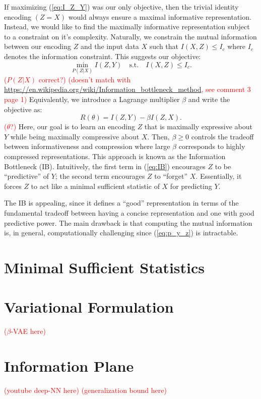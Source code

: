 \documentclass[11pt]{article}
\newcommand\myworries[1]{\textcolor{red}{(#1)}}
\begin{document}
If maximizing (\ref{eq:I_Z_Y}) was our only objective, then the trivial identity encoding $(Z = X)$ would always ensure a maximal informative representation. Instead, we would like to find the maximally informative representation subject to a constraint on it's complexity. Naturally, we constrain the mutual information between our encoding $Z$ and the input data $X$ such that $I(X,Z) \leq I_c$ where $I_c$ denotes the information constraint. This suggests our objective:
\begin{equation}
\underset{P(Z\vert X)}{\min} I(Z,Y) \quad\text{s.t.}\quad I(X,Z) \leq I_c.
\end{equation}
\myworries{$P(Z\vert X)$ correct?}
\myworries{doesn't match with \url{https://en.wikipedia.org/wiki/Information_bottleneck_method}, see comment 3 page 1}
Equivalently, we introduce a Lagrange multiplier $\beta$ and write the objective as:
\begin{equation}
R(\theta) = I(Z,Y) - \beta I(Z,X).
\label{eq:IB}
\end{equation}
\myworries{$\theta$?}
Here, our goal is to learn an encoding $Z$ that is maximally expressive about $Y$ while being maximally compressive about $X$. Then, $\beta\geq 0$ controls the tradeoff between informativeness and compression where large $\beta$ corresponds to highly compressed representations. This approach is known as the Information Bottleneck (IB). Intuitively, the first term in (\ref{eq:IB}) encourages $Z$ to be ``predictive'' of $Y$; the second term encourages $Z$ to ``forget'' $X$. Essentially, it forces $Z$ to act like a minimal sufficient statistic of $X$ for predicting $Y$.

The IB is appealing, since it defines a ``good'' representation in terms of the fundamental tradeoff between having a concise representation and one with good predictive power. The main drawback is that computing the mutual information is, in general, computationally challenging since (\ref{eq:p_y_z}) is intractable.

\section{Minimal Sufficient Statistics}

\section{Variational Formulation}


\myworries{$\beta$-VAE here}

\section{Information Plane}




\myworries{youtube deep-NN here}
\myworries{generalization bound here}


 
\end{document}
